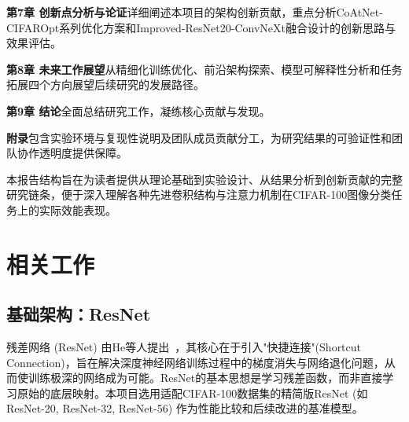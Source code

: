 \documentclass[a4paper]{article}
\begin{document}
\textbf{第7章 创新点分析与论证}详细阐述本项目的架构创新贡献，重点分析CoAtNet-CIFAROpt系列优化方案和Improved-ResNet20-ConvNeXt融合设计的创新思路与效果评估。

\textbf{第8章 未来工作展望}从精细化训练优化、前沿架构探索、模型可解释性分析和任务拓展四个方向展望后续研究的发展路径。

\textbf{第9章 结论}全面总结研究工作，凝练核心贡献与发现。

\textbf{附录}包含实验环境与复现性说明及团队成员贡献分工，为研究结果的可验证性和团队协作透明度提供保障。

本报告结构旨在为读者提供从理论基础到实验设计、从结果分析到创新贡献的完整研究链条，便于深入理解各种先进卷积结构与注意力机制在CIFAR-100图像分类任务上的实际效能表现。

\section{相关工作}
\subsection{基础架构：ResNet}
残差网络 (ResNet) 由He等人提出~\cite{he2016deep}，其核心在于引入"快捷连接"(Shortcut Connection)，旨在解决深度神经网络训练过程中的梯度消失与网络退化问题，从而使训练极深的网络成为可能。ResNet的基本思想是学习残差函数，而非直接学习原始的底层映射。本项目选用适配CIFAR-100数据集的精简版ResNet (如ResNet-20, ResNet-32, ResNet-56) 作为性能比较和后续改进的基准模型。
\end{document}
